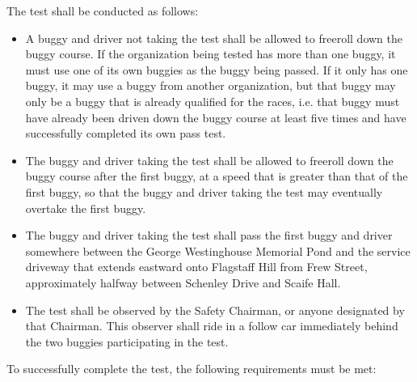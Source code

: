 	\noindent The test shall be conducted as follows:

	\begin{itemize}

		\item A buggy and driver not taking the test shall be allowed to freeroll
		down the buggy course. If the organization being tested has more than one
		buggy, it must use one of its own buggies as the buggy being passed. If it only
		has one buggy, it may use a buggy from another organization, but that buggy may
		only be a buggy that is already qualified for the races, i.e. that buggy must
		have already been driven down the buggy course at least five times and have
		successfully completed its own pass test.

		\item The buggy and driver taking the test shall be allowed to freeroll
		down the buggy course after the first buggy, at a speed that is greater than
		that of the first buggy, so that the buggy and driver taking the test may
		eventually overtake the first buggy.

		\item The buggy and driver taking the test shall pass the first buggy and
		driver somewhere between the George Westinghouse Memorial Pond and the service
		driveway that extends eastward onto Flagstaff Hill from Frew Street,
		approximately halfway between Schenley Drive and Scaife Hall.

		\item The test shall be observed by the Safety Chairman, or anyone
		designated by that Chairman. This observer shall ride in a follow car
		immediately behind the two buggies participating in the test.

	\end{itemize}

	\noindent To successfully complete the test, the following requirements must be met:

